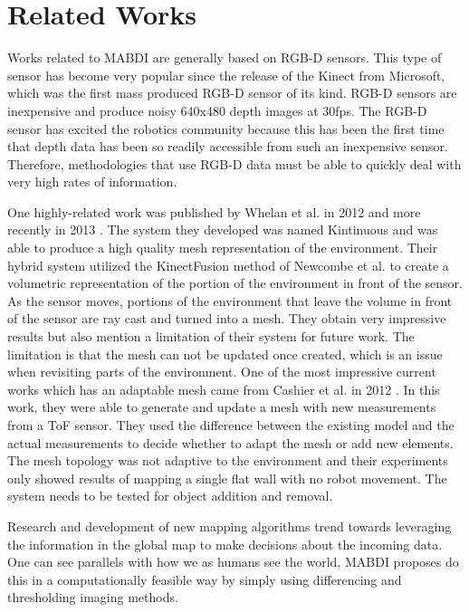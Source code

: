 \section{Related Works}	\label{sec:related_works}

Works related to MABDI are generally based on RGB-D sensors. This type of sensor has
become very popular since the release of the Kinect from Microsoft, which
was the first mass produced RGB-D sensor of its kind. RGB-D sensors are
inexpensive and produce noisy 640x480 depth images at 30fps. The RGB-D
sensor has excited the robotics community because this has been the first
time that depth data has been so readily accessible from such an
inexpensive sensor. Therefore, methodologies that use RGB-D data must be able to quickly
deal with very high rates of information.

One highly-related work was published by Whelan
et al. in 2012 \cite{Whelan2012} and more recently in 2013
\cite{Whelan12tr}. The system they developed was named Kintinuous and was
able to produce a high quality mesh representation of the environment.
Their hybrid system utilized the KinectFusion method
\cite{Newcombe2011a} of Newcombe et al. to create a volumetric
representation of the portion of the environment in front of the sensor. As
the sensor moves, portions of the environment that leave the volume in
front of the sensor are ray cast and turned into a mesh. They obtain very
impressive results but also mention a limitation of their system for future
work. The limitation is that the mesh can not be updated once created,
which is an issue when revisiting parts of the environment. One of the most
impressive current works which has an adaptable mesh came from Cashier et
al. in 2012 \cite{Cahier2012}. In this work, they were able to generate and
update a mesh with new measurements from a ToF sensor. They used the
difference between the existing model and the actual measurements to decide
whether to adapt the mesh or add new elements. The mesh topology was not
adaptive to the environment and their experiments only showed results of mapping a
single flat wall with no robot movement. The system needs to be tested for
object addition and removal.

Research and development of new mapping algorithms trend towards
leveraging the information in the global map to make decisions about the
incoming data. One can see parallels with how we as humans see the world. MABDI
proposes do this in a computationally feasible way by simply using
differencing and thresholding imaging methods.








